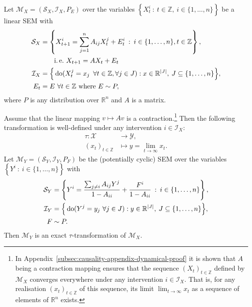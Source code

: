 \medskip

\begin{theorem}\label{theorem:identical}
Let $\mathcal{M}_X = \left(\mathcal{S}_X, \mathcal{I}_X, P_{E} \right)$ over the variables ${\left\lbrace X_t^i \: : \: t \in \mathbb{Z}, \: i\in \{1,\ldots,n\} \right\rbrace}$ be a linear SEM with
%
\begin{align*}
\mathcal{S}_X &= \left\lbrace X_{t+1}^i = \sum_{j=1}^n A_{ij}X_t^j + E_t^i \:  : \: i \in \{1,\ldots,n\}, t\in\mathbb{Z} \right\rbrace, \\
&\qquad\text{i.\,e.}\ X_{t+1} = AX_t + E_t \\
%
\mathcal{I}_X &= \Big{\{} \doop(X_t^j= x_j \enspace \forall t \in \mathbb{Z},\forall j \in J):  x \in \mathbb{R}^{|J|}, \: J \subseteq \{1,\ldots,n\} \Big{\}}, \\
%
E_t &= E\ \forall t\in\mathbb{Z} \text{ where } E \sim P,
\end{align*}
%
where $P$ is any distribution over $\mathbb{R}^n$ and $A$ is a matrix.

Assume that the linear mapping $v\mapsto Av$ is a contraction.\footnote{In Appendix~\ref{subsec:causality-appendix-dynamical-proof} it is shown that $A$ being a contraction mapping ensures that the sequence $(X_t)_{t\in\mathbb{Z}}$ defined by $\mathcal{M}_X$ converges everywhere under any intervention $i\in\mathcal{I}_X$. That is, for any realisation $(x_t)_{t\in\mathbb{Z}}$ of this sequence, its limit $\lim_{t\rightarrow \infty}x_t$ as a sequence of elements of $\mathbb{R}^n$ exists.}
Then the following transformation is well-defined under any intervention $i\in\mathcal{I}_X$:
%
\begin{align*}
\tau : \mathcal{X} &\rightarrow \mathcal{Y}, \\
(x_t)_{t\in \mathbb{Z}} & \mapsto y= \lim_{t\rightarrow \infty} x_t.
\end{align*}
%
Let ${\mathcal{M}_Y = \left(\mathcal{S}_Y, \mathcal{I}_Y, P_{F} \right)}$ be the (potentially cyclic) SEM over the variables ${\left\lbrace Y^i \: :  \: i\in \{1,\ldots,n\} \right\rbrace}$  with
%
\begin{align*}
\mathcal{S}_Y &= \left\lbrace Y^i = \frac{\sum_{j\not=i} A_{ij}Y^j}{1-A_{ii}} + \frac{F^i}{1-A_{ii}} \:  : \: i \in \{1,\ldots,n\} \right\rbrace, \\
%
\mathcal{I}_Y &= \Big{\{} \doop(Y^j= y_j \ \forall j \in J) : y \in \mathbb{R}^{|J|}, \: J \subseteq \{1,\ldots,n\} \Big{\}}, \\
%
F &\sim P.
\end{align*}
%
Then $\mathcal{M}_Y$ is an exact $\tau$-transformation of $\mathcal{M}_X$.
\end{theorem}

